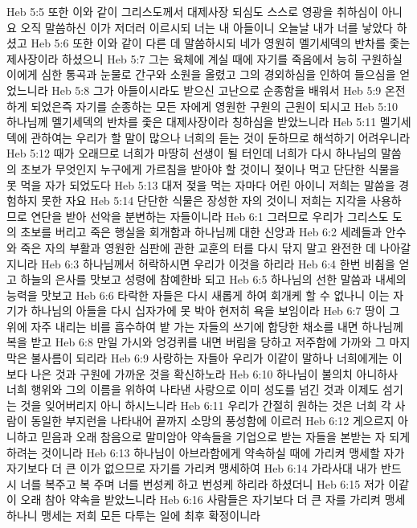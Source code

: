Heb 5:5  또한 이와 같이 그리스도께서 대제사장 되심도 스스로 영광을 취하심이 아니요 오직 말씀하신 이가 저더러 이르시되 너는 내 아들이니 오늘날 내가 너를 낳았다 하셨고
Heb 5:6  또한 이와 같이 다른 데 말씀하시되 네가 영원히 멜기세덱의 반차를 좇는 제사장이라 하셨으니
Heb 5:7  그는 육체에 계실 때에 자기를 죽음에서 능히 구원하실 이에게 심한 통곡과 눈물로 간구와 소원을 올렸고 그의 경외하심을 인하여 들으심을 얻었느니라
Heb 5:8  그가 아들이시라도 받으신 고난으로 순종함을 배워서
Heb 5:9  온전하게 되었은즉 자기를 순종하는 모든 자에게 영원한 구원의 근원이 되시고
Heb 5:10  하나님께 멜기세덱의 반차를 좇은 대제사장이라 칭하심을 받았느니라
Heb 5:11  멜기세덱에 관하여는 우리가 할 말이 많으나 너희의 듣는 것이 둔하므로 해석하기 어려우니라
Heb 5:12  때가 오래므로 너희가 마땅히 선생이 될 터인데 너희가 다시 하나님의 말씀의 초보가 무엇인지 누구에게 가르침을 받아야 할 것이니 젖이나 먹고 단단한 식물을 못 먹을 자가 되었도다
Heb 5:13  대저 젖을 먹는 자마다 어린 아이니 저희는 말씀을 경험하지 못한 자요
Heb 5:14  단단한 식물은 장성한 자의 것이니 저희는 지각을 사용하므로 연단을 받아 선악을 분변하는 자들이니라
Heb 6:1  그러므로 우리가 그리스도 도의 초보를 버리고 죽은 행실을 회개함과 하나님께 대한 신앙과
Heb 6:2  세례들과 안수와 죽은 자의 부활과 영원한 심판에 관한 교훈의 터를 다시 닦지 말고 완전한 데 나아갈지니라
Heb 6:3  하나님께서 허락하시면 우리가 이것을 하리라
Heb 6:4  한번 비췸을 얻고 하늘의 은사를 맛보고 성령에 참예한바 되고
Heb 6:5  하나님의 선한 말씀과 내세의 능력을 맛보고
Heb 6:6  타락한 자들은 다시 새롭게 하여 회개케 할 수 없나니 이는 자기가 하나님의 아들을 다시 십자가에 못 박아 현저히 욕을 보임이라
Heb 6:7  땅이 그 위에 자주 내리는 비를 흡수하여 밭 가는 자들의 쓰기에 합당한 채소를 내면 하나님께 복을 받고
Heb 6:8  만일 가시와 엉겅퀴를 내면 버림을 당하고 저주함에 가까와 그 마지막은 불사름이 되리라
Heb 6:9  사랑하는 자들아 우리가 이같이 말하나 너희에게는 이보다 나은 것과 구원에 가까운 것을 확신하노라
Heb 6:10  하나님이 불의치 아니하사 너희 행위와 그의 이름을 위하여 나타낸 사랑으로 이미 성도를 넘긴 것과 이제도 섬기는 것을 잊어버리지 아니 하시느니라
Heb 6:11  우리가 간절히 원하는 것은 너희 각 사람이 동일한 부지런을 나타내어 끝까지 소망의 풍성함에 이르러
Heb 6:12  게으르지 아니하고 믿음과 오래 참음으로 말미암아 약속들을 기업으로 받는 자들을 본받는 자 되게 하려는 것이니라
Heb 6:13  하나님이 아브라함에게 약속하실 때에 가리켜 맹세할 자가 자기보다 더 큰 이가 없으므로 자기를 가리켜 맹세하여
Heb 6:14  가라사대 내가 반드시 너를 복주고 복 주며 너를 번성케 하고 번성케 하리라 하셨더니
Heb 6:15  저가 이같이 오래 참아 약속을 받았느니라
Heb 6:16  사람들은 자기보다 더 큰 자를 가리켜 맹세하나니 맹세는 저희 모든 다투는 일에 최후 확정이니라
